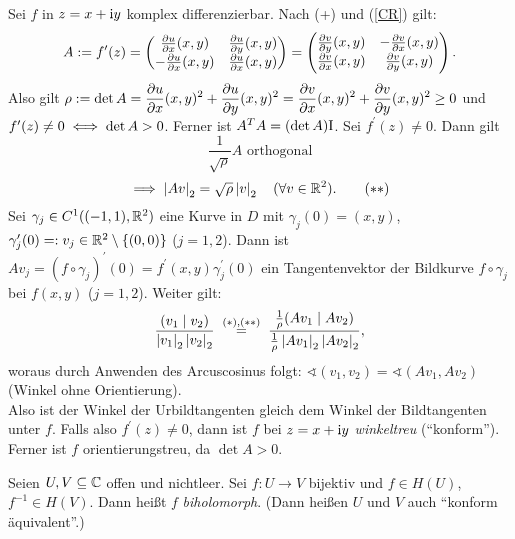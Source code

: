 \documentclass[a4paper,twoside,DIV15,BCOR12mm]{scrbook}
\begin{document}
\begin{bem} \label{bem1.6}
Sei $f$ in $z = x+\mathrm{i} y$ komplex differenzierbar. Nach (+) und (\ref{CR}) gilt:
\begin{equation}
A \da f^\prime(z) = \left(\!\!\!\begin{array}{c c}\frac{\partial u}{\partial x}(x,y)&\frac{\partial u}{\partial y}(x,y)\\-\frac{\partial u}{\partial x}(x,y)&\frac{\partial u}{\partial x}(x,y)\end{array}\!\!\!\right) = \left(\!\!\!\begin{array}{c c}\frac{\partial v}{\partial y}(x,y)&-\frac{\partial v}{\partial x}(x,y)\\\frac{\partial v}{\partial x}(x,y)&\frac{\partial v}{\partial y}(x,y)\end{array}\!\!\!\right).
\end{equation}
Also gilt $\rho := \displaystyle \det A = \frac{\partial u}{\partial x}(x,y)^2 + \frac{\partial u}{\partial y}(x,y)^2 =
\frac{\partial v}{\partial x}(x,y)^2 + \frac{\partial v}{\partial y}(x,y)^2 \geq 0$ und \\ $f^\prime(z) \neq 0 \iff \det A > 0$.
Ferner ist $A^TA = (\det A)\mathrm{I}$. Sei $f^\prime(z) \neq 0$. Dann gilt
\[\frac{1}{\sqrt{\rho}}A \text{ orthogonal} \tag{$*$}\]
\[\implies \left\lvert Av\right\lvert_2 = \sqrt{\rho} \left\lvert v\right\lvert_2 \quad (\forall v \in \mathbb{R}^2). \tag{$**$}\]
Sei $\gamma_j \in C^1((-1,1), \mathbb{R}^2)$ eine Kurve in $D$ mit $\gamma_j(0) = (x, y)$, $\gamma_j^\prime(0) =: v_j \in \mathbb{R}^2
\setminus \{(0,0)\}$ ($j=1,2$). Dann ist $Av_j = (f \circ \gamma_j)^\prime(0) = f^\prime(x, y) \gamma_j^\prime(0)$ ein
Tangentenvektor der Bildkurve $f \circ \gamma_j$ bei $f(x, y)$ ($j=1,2$). Weiter gilt: \[\frac{(v_1\mid v_2)}{\abs{v_1}_2
  \abs{v_2}_2} \nach{=}{($*$),($**$)} \frac{\frac1\rho (Av_1\mid Av_2)}{\frac1\rho \abs{Av_1}_2 \abs{Av_2}_2},\]
woraus durch Anwenden des Arcuscosinus folgt: $\sphericalangle(v_1,v_2) = \sphericalangle(Av_1,Av_2)$ (Winkel ohne Orientierung).\\
Also ist der Winkel der Urbildtangenten gleich dem Winkel der Bildtangenten unter $f$. Falls also $f^\prime(z)\neq0$, dann ist
$f$ bei $z=x+\mathrm{i} y$ \emph{winkeltreu} (``konform''). Ferner ist $f$ orientierungstreu, da $\det A > 0$.
\end{bem}

\begin{dfn} \label{dfn1.7}
Seien $U, V \subseteq \mathbb{C}$ offen und nichtleer. Sei $f\colon U \to V$ bijektiv und $f\in H(U)$, $f^{-1}\in H(V)$. Dann heißt $f$ \emph{biholomorph}. (Dann heißen $U$ und $V$ auch ``konform äquivalent''.)
\end{dfn}
\end{document}
